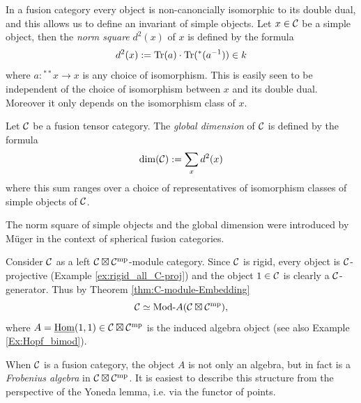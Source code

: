 \documentclass{amsart}
\begin{document}
In a fusion category every object is non-canoncially isomorphic to its double dual, and this allows us to define an invariant of simple objects. Let $x \in \cC$ be a simple object, then the {\em norm square} $d^2(x)$ of $x$ is defined by the formula 
\begin{equation*}
	d^2(x) := \Tr(a) \cdot \Tr({}^*(a^{-1})) \in k
\end{equation*}
where $a: {}^{**}x \to x$ is any choice of isomorphism. This is easily seen to be independent of the choice of isomorphism between $x$ and its double dual. Moreover it only depends on the isomorphism class of $x$. 
\begin{definition}
	Let $\cC$ be a fusion tensor category. The {\em global dimension} of $\cC$ is defined by the formula
	\begin{equation*}
		\dim(\cC) := \sum_{x} d^2(x)
	\end{equation*}
	where this sum ranges over a choice of representatives of isomorphism classes of simple objects of $\cC$. 
\end{definition}
\noindent The norm square of simple objects and the global dimension were introduced by M\"uger \cite{MR1966524} in the context of spherical fusion categories.

Consider $\cC$ as a left $\cC \boxtimes \cC^\mp$-module category. Since $\cC$ is rigid, every object is $\cC$-projective (Example \ref{ex:rigid_all_C-proj}) and the object $1 \in \cC$ is clearly a $\cC$-generator. Thus by Theorem \ref{thm:C-module-Embedding} 
\begin{equation*}
	\cC \simeq \Mod{}{A}(\cC \boxtimes \cC^\mp),
\end{equation*}
where  $A = \IHom(1,1) \in \cC \boxtimes \cC^\mp$ is the induced algebra object (see also Example \ref{Ex:Hopf_bimod}).  

When $\cC$ is a fusion category, the object $A$ is not only an algebra, but in fact is a {\em Frobenius algebra} in $\cC \boxtimes \cC^\mp$. It is easiest to describe this structure from the perspective of the Yoneda lemma, i.e. via the functor of points. 
\end{document}
